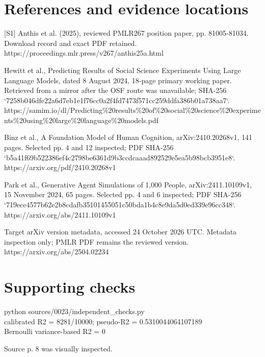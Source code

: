 \documentclass[10pt]{article}
\begin{document}
\section*{References and evidence locations}
[S1] Anthis et al. (2025), reviewed PMLR267 position paper, pp. 81005-81034. Download record and exact PDF retained.
https://proceedings.mlr.press/v267/anthis25a.html\par
[S2] Hewitt et al., Predicting Results of Social Science Experiments Using Large Language Models, dated 8 August 2024, 18-page primary working paper. Retrieved from a mirror after the OSF route was unavailable; SHA-256 `7258b046dfe22a6d7eb1e1f76cc0a2f4fd7473f571cc259ddfa386b01a738aa7`.
https://samim.io/dl/Predicting\%20results\%20of\%20social\%20science\%20experiments\%20using\%20large\%20language\%20models.pdf\par
[S3] Binz et al., A Foundation Model of Human Cognition, arXiv:2410.20268v1, 141 pages. Selected pp. 4 and 12 inspected; PDF SHA-256 `b5a41f69b522386ef4c2798be6361d9b3ccdcaaad892529e5ea5b98bcb3951e8`.
https://arxiv.org/pdf/2410.20268v1\par
[S4] Park et al., Generative Agent Simulations of 1,000 People, arXiv:2411.10109v1, 15 November 2024, 65 pages. Selected pp. 4 and 6 inspected; PDF SHA-256 `719ece4577b62e2b8cdafb35101455051c50bda1b4c8e9da5d0ed339e96cc348`.
https://arxiv.org/abs/2411.10109v1\par
[S5] Target arXiv version metadata, accessed 24 October 2026 UTC. Metadata inspection only; PMLR PDF remains the reviewed version.
https://arxiv.org/abs/2504.02234\par
\section*{Supporting checks}
{\ttfamily\footnotesize python sources/0023/independent\_checks.py\\
calibrated R2 = 8281/10000; pseudo-R2 = 0.5310044064107189\\
Bernoulli variance-based R2 = 0}\par
Source p. 8 was visually inspected.\par
\end{document}
